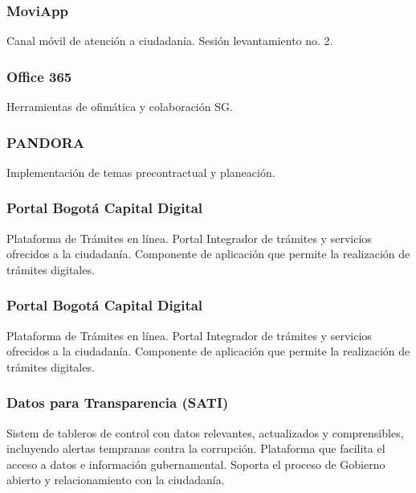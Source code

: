 \documentclass[
	a4paper, %
	12pt, %
]{include/CSSullivanBusinessReport}
\begin{document}
\subsubsection{MoviApp}\label{sec:moviapp}

Canal móvil de atención a ciudadanía. Sesión levantamiento no. 2.

\subsubsection{Office 365}\label{sec:office-365}

Herramientas de ofimática y colaboración SG.

\subsubsection{PANDORA}\label{sec:pandora}

Implementación de temas precontractual y planeación.

\subsubsection{Portal Bogotá Capital
Digital}\label{sec:portal-bogotuxe1-capital-digital}

Plataforma de Trámites en línea. Portal Integrador de trámites y
servicios ofrecidos a la ciudadanía. Componente de aplicación que
permite la realización de trámites digitales.

\subsubsection{Portal Bogotá Capital
Digital}\label{sec:portal-bogotuxe1-capital-digital-1}

Plataforma de Trámites en línea. Portal Integrador de trámites y
servicios ofrecidos a la ciudadanía. Componente de aplicación que
permite la realización de trámites digitales.

\subsubsection{Datos para Transparencia
(SATI)}\label{sec:datos-para-transparencia-sati-1}

Sistem de tableros de control con datos relevantes, actualizados y
comprensibles, incluyendo alertas tempranas contra la corrupción.
Plataforma que facilita el acceso a datos e información gubernamental.
Soporta el proceso de Gobierno abierto y relacionamiento con la
ciudadanía.
\end{document}
